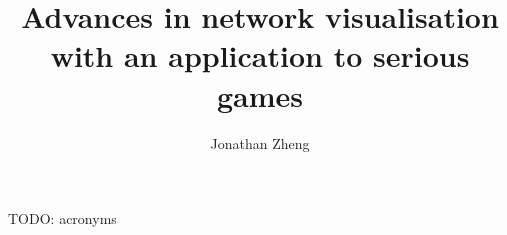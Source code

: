 \documentclass[a4paper,12pt,twoside]{report}
\begin{document}
\title{\LARGE {\bf Advances in network visualisation with an application to serious games}\\
 \vspace*{6mm}
}

\author{Jonathan Zheng}

\normallinespacing
\maketitle

\preface




TODO: acronyms

\body








\appendix



\end{document}

